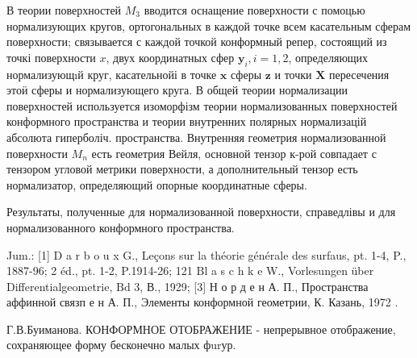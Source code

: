 \documentclass[10pt]{article}
\begin{document}
В теории поверхностей $M_{3}$ вводится оснащение поверхности с помоцью нормализующих кругов, ортогональных в каждой точке всем касательным сферам поверхности; связывается с каждой точкой конформный репер, состоящий из точкі поверхности $x$, двух координатных сфер $\boldsymbol{y}_{i}, i=1,2$, определяющих нормализующıй круг, касательнойі в точке $\boldsymbol{x}$ сферы $\boldsymbol{z}$ и точки $\boldsymbol{X}$ пересечения этоӥ сферы и нормализующего круга. В общей теории нормализации поверхностей используется изоморфізм теории нормализованных поверхностей конформного пространства и теории внутренних полярных нормализацій абсолюта гиперболіч. пространства. Внутренняя геометрия нормализованной поверхности $M_{n}$ есть геометрия Вейля, основной тензор к-рой совпадает с тензором угловой метрики поверхности, а дополнительный тензор есть нормализатор, определяющий опорные координатные сферы.



Результаты, полученные для нормализованной поверхности, справедлівы и для нормализованного конформного пространства.



Jum.: [1] D a r b o u x G., Leçons sur la théorie générale des surfaus, pt. 1-4, P., 1887-96; 2 éd., pt. 1-2, P.1914-26; 121 $\mathrm{Bl}$ a s c h k e W., Vorlesungen über Differentialgeometrie, $\mathrm{Bd}$ 3, В., 1929; [3] Н о р д е н А. П., Пространства аффинной связп е н А. П., Элементы конформной геометрии, К. Казань, 1972 .



Г.В.Буиманова. КОНФОРМНОЕ ОТОБРАЖЕНИЕ - непрерывное отображение, сохраняющее форму бесконечно малых фurур.
\end{document}

